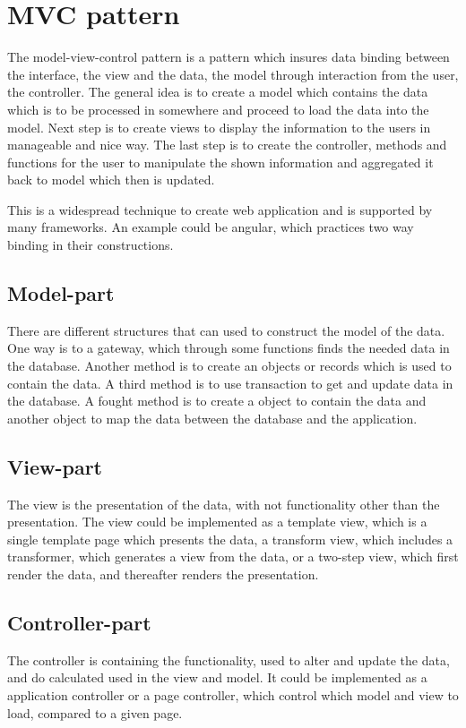 \section{MVC pattern}
The model-view-control pattern is a pattern which insures data binding between the interface, the view and the data, the model through interaction from the user, the controller.
The general idea is to create a model which contains the data which is to be processed in somewhere and proceed to load the data into the model.
Next step is to create views to display the information to the users in manageable and nice way. The last step is to create the controller, methods and functions for the user to manipulate the shown information and aggregated it back to model which then is updated.

This is a widespread technique to create web application and is supported by many frameworks. An example could be angular, which practices two way binding in their constructions.

\subsection{Model-part}
There are different structures that can used to construct the model of the data. One way is to a gateway, which through some functions finds the needed data in the database. Another method is to create an objects or records which is used to contain the data. A third method is to use transaction to get and update data in the database. A fought method is to create a object to contain the data and another object to map the data between the database and the application.

\subsection{View-part}
The view is the presentation of the data, with not functionality other than the presentation. The view could be implemented as a template view, which is a single template page which presents the data, a transform view, which includes a transformer, which generates a view from the data, or a two-step view, which first render the data, and thereafter renders the presentation.

\subsection{Controller-part}
The controller is containing the functionality, used to alter and update the data, and do calculated used in the view and model. It could be implemented as a application controller or a page controller, which control which model and view to load, compared to a given page.